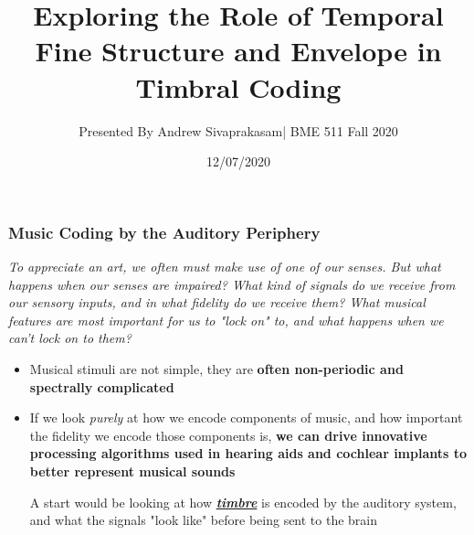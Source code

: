 \documentclass[aspectratio=1610]{beamer}
\title{Exploring the Role of Temporal Fine Structure and Envelope in Timbral Coding}
\author{Presented By Andrew Sivaprakasam| BME 511 Fall 2020}
\date{12/07/2020}
\begin{document}
\frame{\titlepage}

\begin{frame}
\frametitle{Music Coding by the Auditory Periphery}

\textit{To appreciate an art, we often must make use of one of our senses. But what happens when our senses are impaired? What kind of signals do we receive from our sensory inputs, and in what fidelity do we receive them? What musical features are most important for us to "lock on" to, and what happens when we can't lock on to them?}\vspace{.5em}

\begin{itemize}[label = $\blacktriangleright$]
\item Musical stimuli are not simple, they are \textbf{often non-periodic and spectrally complicated}
\item If we look \textit{purely} at how we encode components of music, and how important the fidelity we encode those components is, \textbf{we can drive innovative processing algorithms used in hearing aids and cochlear implants to better represent musical sounds}\vspace{1em}

A start would be looking at how \textbf{\textit{\underline{timbre}}} is encoded by the auditory system, and what the signals "look like" before being sent to the brain

\end{itemize}
\end{frame}
\end{document}
